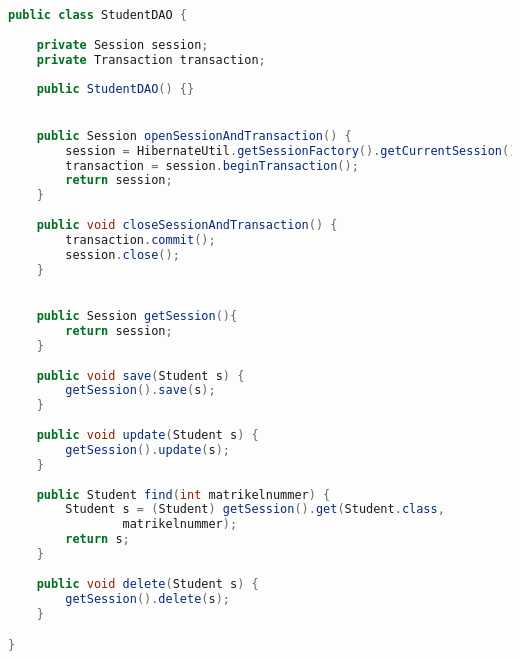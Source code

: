 \hspace{0pt}
\begin{lstlisting}[language=Java]
public class StudentDAO {
	
	private Session session;
	private Transaction transaction;
	
	public StudentDAO() {} 

	
	public Session openSessionAndTransaction() {
		session = HibernateUtil.getSessionFactory().getCurrentSession();
		transaction = session.beginTransaction();
		return session;
	}
	
	public void closeSessionAndTransaction() {
		transaction.commit();
		session.close();
	}

	
	public Session getSession(){
		return session;
	}
	
	public void save(Student s) {
		getSession().save(s);
	}
	
	public void update(Student s) {
		getSession().update(s);
	}
	
	public Student find(int matrikelnummer) {
		Student s = (Student) getSession().get(Student.class, 
				matrikelnummer);
		return s;
	}
	
	public void delete(Student s) {
		getSession().delete(s);
	}

}

\end{lstlisting}
